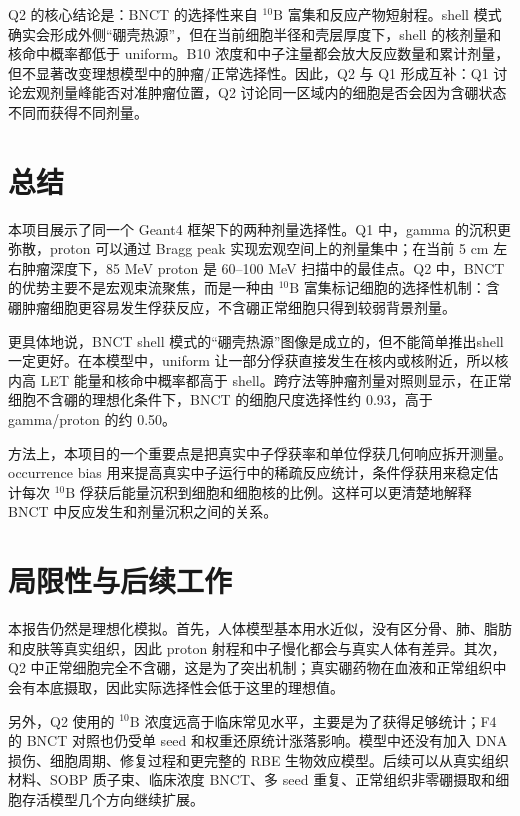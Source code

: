 \documentclass[12pt,hyperref,a4paper,UTF8,fontset=fandol]{ctexart}
\begin{document}
Q2 的核心结论是：BNCT 的选择性来自 $^{10}\mathrm{B}$ 富集和反应产物短射程。shell 模式确实会形成外侧“硼壳热源”，但在当前细胞半径和壳层厚度下，shell 的核剂量和核命中概率都低于 uniform。B10 浓度和中子注量都会放大反应数量和累计剂量，但不显著改变理想模型中的肿瘤/正常选择性。因此，Q2 与 Q1 形成互补：Q1 讨论宏观剂量峰能否对准肿瘤位置，Q2 讨论同一区域内的细胞是否会因为含硼状态不同而获得不同剂量。

\section{总结}

本项目展示了同一个 Geant4 框架下的两种剂量选择性。Q1 中，gamma 的沉积更弥散，proton 可以通过 Bragg peak 实现宏观空间上的剂量集中；在当前 5 cm 左右肿瘤深度下，85 MeV proton 是 60--100 MeV 扫描中的最佳点。Q2 中，BNCT 的优势主要不是宏观束流聚焦，而是一种由 $^{10}\mathrm{B}$ 富集标记细胞的选择性机制：含硼肿瘤细胞更容易发生俘获反应，不含硼正常细胞只得到较弱背景剂量。

更具体地说，BNCT shell 模式的“硼壳热源”图像是成立的，但不能简单推出shell 一定更好。在本模型中，uniform 让一部分俘获直接发生在核内或核附近，所以核内高 LET 能量和核命中概率都高于 shell。跨疗法等肿瘤剂量对照则显示，在正常细胞不含硼的理想化条件下，BNCT 的细胞尺度选择性约 0.93，高于 gamma/proton 的约 0.50。

方法上，本项目的一个重要点是把真实中子俘获率和单位俘获几何响应拆开测量。occurrence bias 用来提高真实中子运行中的稀疏反应统计，条件俘获用来稳定估计每次 $^{10}\mathrm{B}$ 俘获后能量沉积到细胞和细胞核的比例。这样可以更清楚地解释 BNCT 中反应发生和剂量沉积之间的关系。

\section{局限性与后续工作}

本报告仍然是理想化模拟。首先，人体模型基本用水近似，没有区分骨、肺、脂肪和皮肤等真实组织，因此 proton 射程和中子慢化都会与真实人体有差异。其次，Q2 中正常细胞完全不含硼，这是为了突出机制；真实硼药物在血液和正常组织中会有本底摄取，因此实际选择性会低于这里的理想值。

另外，Q2 使用的 $^{10}\mathrm{B}$ 浓度远高于临床常见水平，主要是为了获得足够统计；F4 的 BNCT 对照也仍受单 seed 和权重还原统计涨落影响。模型中还没有加入 DNA 损伤、细胞周期、修复过程和更完整的 RBE 生物效应模型。后续可以从真实组织材料、SOBP 质子束、临床浓度 BNCT、多 seed 重复、正常组织非零硼摄取和细胞存活模型几个方向继续扩展。
\end{document}
